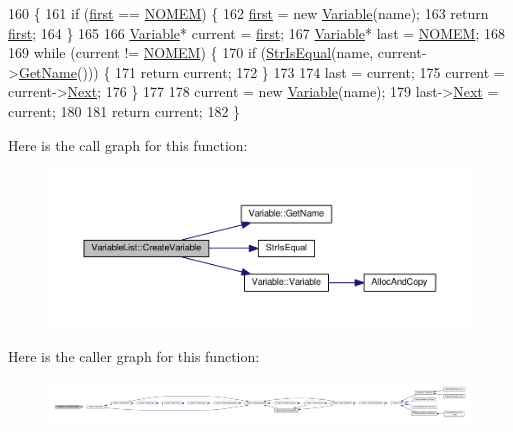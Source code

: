 \begin{DoxyCode}
160 \{
161     \textcolor{keywordflow}{if} (\hyperlink{classVariableList_a353a26f311a6d98716485f50c6907f7e}{first} == \hyperlink{platform_8h_a46ff2bfbf0d44b8466a2251d5bd5e6f8}{NOMEM}) \{
162         \hyperlink{classVariableList_a353a26f311a6d98716485f50c6907f7e}{first} = \textcolor{keyword}{new} \hyperlink{classVariable}{Variable}(name);
163         \textcolor{keywordflow}{return} \hyperlink{classVariableList_a353a26f311a6d98716485f50c6907f7e}{first};
164     \}
165 
166     \hyperlink{classVariable}{Variable}* current = \hyperlink{classVariableList_a353a26f311a6d98716485f50c6907f7e}{first};
167     \hyperlink{classVariable}{Variable}* last = \hyperlink{platform_8h_a46ff2bfbf0d44b8466a2251d5bd5e6f8}{NOMEM};
168 
169     \textcolor{keywordflow}{while} (current != \hyperlink{platform_8h_a46ff2bfbf0d44b8466a2251d5bd5e6f8}{NOMEM}) \{
170         \textcolor{keywordflow}{if} (\hyperlink{clib_8h_a2a1f39d11cbbaac992d42e67557dac4b}{StrIsEqual}(name, current->\hyperlink{classVariable_accf221d35cec8a9707e84891b715fb6c}{GetName}())) \{
171             \textcolor{keywordflow}{return} current;
172         \}
173 
174         last = current;
175         current = current->\hyperlink{classVariable_ac5662d23fccccf25e3565793841ce580}{Next};
176     \}
177 
178     current = \textcolor{keyword}{new} \hyperlink{classVariable}{Variable}(name);
179     last->\hyperlink{classVariable_ac5662d23fccccf25e3565793841ce580}{Next} = current;
180 
181     \textcolor{keywordflow}{return} current;
182 \}
\end{DoxyCode}


Here is the call graph for this function\+:\nopagebreak
\begin{figure}[H]
\begin{center}
\leavevmode
\includegraphics[width=350pt]{classVariableList_ac78b3d52283bec7cbd8e7e2d217e1608_cgraph}
\end{center}
\end{figure}




Here is the caller graph for this function\+:\nopagebreak
\begin{figure}[H]
\begin{center}
\leavevmode
\includegraphics[width=350pt]{classVariableList_ac78b3d52283bec7cbd8e7e2d217e1608_icgraph}
\end{center}
\end{figure}


